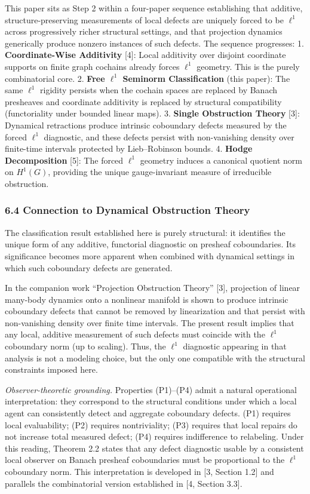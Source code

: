 \documentclass[
]{article}
\begin{document}
This paper sits as Step 2 within a four-paper sequence establishing that
additive, structure-preserving measurements of local defects are
uniquely forced to be \(\ell^1\) across progressively richer structural
settings, and that projection dynamics generically produce nonzero
instances of such defects. The sequence progresses: 1.
\textbf{Coordinate-Wise Additivity} {[}4{]}: Local additivity over
disjoint coordinate supports on finite graph cochains already forces
\(\ell^1\) geometry. This is the purely combinatorial core. 2.
\textbf{Free \(\ell^1\) Seminorm Classification} (this paper): The same
\(\ell^1\) rigidity persists when the cochain spaces are replaced by
Banach presheaves and coordinate additivity is replaced by structural
compatibility (functoriality under bounded linear maps). 3.
\textbf{Single Obstruction Theory} {[}3{]}: Dynamical retractions
produce intrinsic coboundary defects measured by the forced \(\ell^1\)
diagnostic, and these defects persist with non-vanishing density over
finite-time intervals protected by Lieb--Robinson bounds. 4.
\textbf{Hodge Decomposition} {[}5{]}: The forced \(\ell^1\) geometry
induces a canonical quotient norm on \(H^1(G)\), providing the unique
gauge-invariant measure of irreducible obstruction.

\subsubsection{6.4 Connection to Dynamical Obstruction
Theory}\label{connection-to-dynamical-obstruction-theory}

The classification result established here is purely structural: it
identifies the unique form of any additive, functorial diagnostic on
presheaf coboundaries. Its significance becomes more apparent when
combined with dynamical settings in which such coboundary defects are
generated.

In the companion work ``Projection Obstruction Theory'' {[}3{]},
projection of linear many-body dynamics onto a nonlinear manifold is
shown to produce intrinsic coboundary defects that cannot be removed by
linearization and that persist with non-vanishing density over finite
time intervals. The present result implies that any local, additive
measurement of such defects must coincide with the \(\ell^1\) coboundary
norm (up to scaling). Thus, the \(\ell^1\) diagnostic appearing in that
analysis is not a modeling choice, but the only one compatible with the
structural constraints imposed here.

\emph{Observer-theoretic grounding.} Properties (P1)--(P4) admit a
natural operational interpretation: they correspond to the structural
conditions under which a local agent can consistently detect and
aggregate coboundary defects. (P1) requires local evaluability; (P2)
requires nontriviality; (P3) requires that local repairs do not increase
total measured defect; (P4) requires indifference to relabeling. Under
this reading, Theorem 2.2 states that any defect diagnostic usable by a
consistent local observer on Banach presheaf coboundaries must be
proportional to the \(\ell^1\) coboundary norm. This interpretation is
developed in {[}3, Section 1.2{]} and parallels the combinatorial
version established in {[}4, Section 3.3{]}.
\end{document}
